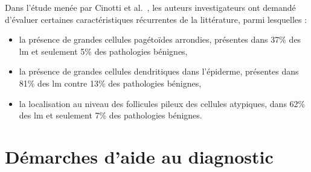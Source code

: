 Dans l'étude menée par Cinotti et al.~\cite{Cinotti2018}, les auteurs investigateurs ont demandé d'évaluer certaines caractéristiques récurrentes de la littérature, parmi lesquelles :
\begin{itemize}
    \item la présence de grandes cellules pagétoïdes arrondies, présentes dans 37\% des \gls{lm} et seulement 5\% des pathologies bénignes,
    \item la présence de grandes cellules dendritiques dans l'épiderme, présentes dans 81\% des \gls{lm} contre 13\% des pathologies bénignes,
    \item la localisation au niveau des follicules pileux des cellules atypiques, dans 62\% des \gls{lm} et seulement 7\% des pathologies bénignes.
\end{itemize}\par

\section{Démarches d'aide au diagnostic}
\label{sec:cad_methods}

\cite{Wiltgen2008}
\cite{Halimi2017a}



